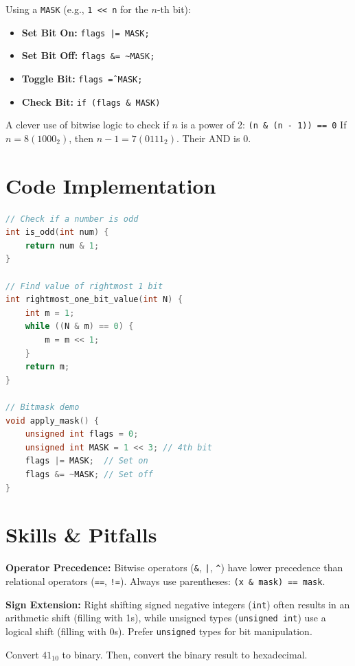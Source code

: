 \begin{example}
    Using a \texttt{MASK} (e.g., \texttt{1 << n} for the $n$-th bit):
    \begin{itemize}
        \item \textbf{Set Bit On:} \texttt{flags |= MASK;}
        \item \textbf{Set Bit Off:} \texttt{flags \&= \textasciitilde MASK;}
        \item \textbf{Toggle Bit:} \texttt{flags \^= MASK;}
        \item \textbf{Check Bit:} \texttt{if (flags \& MASK)}
    \end{itemize}
\end{example}

\begin{example}
    A clever use of bitwise logic to check if $n$ is a power of 2:
    \texttt{(n \& (n - 1)) == 0}
    If $n = 8 (1000_2)$, then $n-1 = 7 (0111_2)$. Their AND is $0$.
\end{example}

\section{Code Implementation}

\begin{lstlisting}[language=C, caption=Common Bitwise Functions]
// Check if a number is odd
int is_odd(int num) {
    return num & 1;
}

// Find value of rightmost 1 bit
int rightmost_one_bit_value(int N) {
    int m = 1;
    while ((N & m) == 0) {
        m = m << 1;
    }
    return m;
}

// Bitmask demo
void apply_mask() {
    unsigned int flags = 0;
    unsigned int MASK = 1 << 3; // 4th bit
    flags |= MASK;  // Set on
    flags &= ~MASK; // Set off
}
\end{lstlisting}

\section{Skills \& Pitfalls}

\begin{remark}
    \textbf{Operator Precedence:} Bitwise operators (\texttt{\&}, \texttt{|}, \texttt{\^}) have lower precedence than relational operators (\texttt{==}, \texttt{!=}). Always use parentheses: \texttt{(x \& mask) == mask}.
\end{remark}

\begin{remark}
    \textbf{Sign Extension:} Right shifting signed negative integers (\texttt{int}) often results in an arithmetic shift (filling with 1s), while unsigned types (\texttt{unsigned int}) use a logical shift (filling with 0s). Prefer \texttt{unsigned} types for bit manipulation.
\end{remark}

\begin{exercise}
    Convert $41_{10}$ to binary. Then, convert the binary result to hexadecimal.
\end{exercise}
